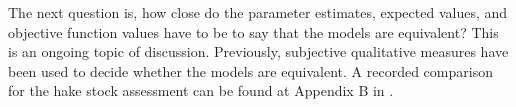 The next question is, how close do the parameter estimates, expected values, and objective function values have to be to say that the models are equivalent? This is an ongoing topic of discussion.  Previously, subjective qualitative measures have been used to decide whether the models are equivalent. A recorded comparison for the hake stock assessment can be found at Appendix B in \cite{horn2017stock}.







